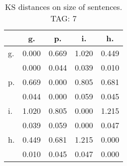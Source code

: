\begin{table}[h!]
\begin{center}
\begin{tabular}{| l | c | c | c | c |}\hline
 & g. & p. & i. & h. \\\hline
g. & 0.000  & 0.669  & 1.020  & 0.449 \\\hline
 & 0.000  & 0.044  & 0.039  & 0.010 \\\hline
p. & 0.669  & 0.000  & 0.805  & 0.681 \\\hline
 & 0.044  & 0.000  & 0.059  & 0.045 \\\hline
i. & 1.020  & 0.805  & 0.000  & 1.215 \\\hline
 & 0.039  & 0.059  & 0.000  & 0.047 \\\hline
h. & 0.449  & 0.681  & 1.215  & 0.000 \\\hline
 & 0.010  & 0.045  & 0.047  & 0.000 \\\hline
\end{tabular}
\caption{KS distances on size of sentences. TAG: 7}
\end{center}
\end{table}